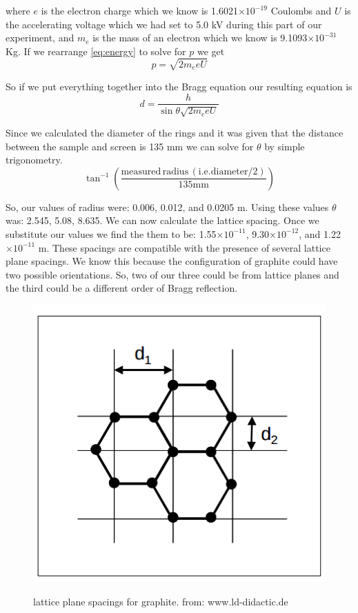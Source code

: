 \documentclass[12pt letterpaper]{article}
\providecommand{\e}[1]{\ensuremath{\times 10^{#1}}}
\begin{document}
where $e$ is the electron charge which we know is 1.6021\e{-19} Coulombs and $U$ is the accelerating voltage which we had set to 5.0 kV during this part of our experiment, and $m_e$ is the mass of an electron which we know is 9.1093\e{-31} Kg. If we rearrange \ref{eq:energy} to solve for $p$ we get 
$$ 
p = \sqrt{2 m_e e U}
$$

So if we put everything together into the Bragg equation our resulting equation is 
\begin{equation}
d = \frac{h}{\sin \theta \sqrt{2 m_e e U}}
\end{equation}

Since we calculated the diameter of the rings and it was given that the distance between the sample and screen is 135 mm we can solve for $\theta$ by simple trigonometry.
$$
\tan^{-1}(\frac{\mathrm{measured \, radius \,(i.e. diameter/2)}}{135 \mathrm{mm}})
$$

So, our values of radius were: 0.006, 0.012, and 0.0205 m. Using these values $\theta$ was: 2.545\degree, 5.08\degree, 8.635\degree. 
We can now calculate the lattice spacing. Once we substitute our values we find the them to be: 1.55\e{-11}, 9.30\e{-12}, and 1.22\e{-11} m. 
These spacings are compatible with the presence of several lattice plane spacings. We know this because the configuration of graphite could have two possible orientations. So, two of our three could be from lattice planes and the third could be a different order of Bragg reflection. 

\begin{figure}[H]
  \caption{lattice plane spacings for graphite. from: www.ld-didactic.de}
  \centering
    \includegraphics[width=.75\textwidth]{lattice_spacing.png}
    \label{fig:lattice}
\end{figure}
\end{document}
